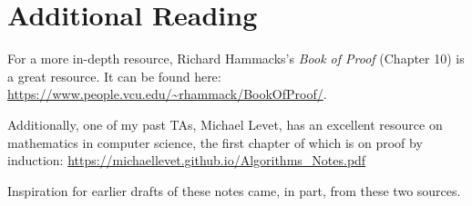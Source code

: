 \documentclass{article}
\theoremstyle{plain}
\newtheorem{claim}{Claim}
\theoremstyle{definition}
\newtheorem{algorithm}{Algorithm}
\begin{document}
    



\section{Additional Reading}

For a more in-depth resource, Richard Hammacks's \emph{Book of Proof} (Chapter 10) is a great resource. It can be found here: \url{https://www.people.vcu.edu/~rhammack/BookOfProof/}.

Additionally, one of my past TAs, Michael Levet, has an excellent resource on mathematics in computer science, the first chapter of which is on proof by induction: \url{https://michaellevet.github.io/Algorithms_Notes.pdf}

Inspiration for earlier drafts of these notes came, in part, from these two sources.
\end{document}
